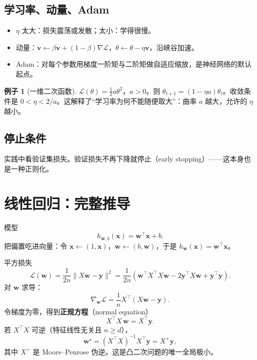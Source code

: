 \documentclass[11pt,a4paper]{article}
\theoremstyle{definition}
\newtheorem{example}{例子}[section]
\theoremstyle{plain}
\theoremstyle{remark}
\newcommand{\loss}{\mathcal{L}}
\begin{document}
\subsection{学习率、动量、Adam}

\begin{itemize}[leftmargin=1.4em]
  \item $\eta$ 太大：损失震荡或发散；太小：学得很慢。
  \item 动量：$\mathbf{v}\leftarrow\beta\mathbf{v}+(1-\beta)\nabla\loss$，$\theta\leftarrow\theta-\eta\mathbf{v}$，沿峡谷加速。
  \item Adam：对每个参数用梯度一阶矩与二阶矩做自适应缩放，是神经网络的默认起点。
\end{itemize}

\begin{example}[一维二次函数]
$\loss(\theta)=\frac12 a\theta^2$，$a>0$。则 $\theta_{t+1}=(1-\eta a)\theta_t$。收敛条件是 $0<\eta<2/a$。这解释了``学习率为何不能随便取大''：曲率 $a$ 越大，允许的 $\eta$ 越小。
\end{example}

\subsection{停止条件}

实践中看验证集损失。验证损失不再下降就停止（early stopping）——这本身也是一种正则化。

\section{线性回归：完整推导}
\label{sec:linreg}

模型
\begin{equation}
  h_{\mathbf{w},b}(\mathbf{x})=\mathbf{w}^\top\mathbf{x}+b.
\end{equation}
把偏置吃进向量：令 $\mathbf{x}\leftarrow(1,\mathbf{x})$，$\mathbf{w}\leftarrow(b,\mathbf{w})$，于是 $h_{\mathbf{w}}(\mathbf{x})=\mathbf{w}^\top\mathbf{x}$。

平方损失
\begin{equation}
  \loss(\mathbf{w})=\frac{1}{2n}\|X\mathbf{w}-\mathbf{y}\|^2
  =\frac{1}{2n}(\mathbf{w}^\top X^\top X\mathbf{w}-2\mathbf{y}^\top X\mathbf{w}+\mathbf{y}^\top\mathbf{y}).
\end{equation}
对 $\mathbf{w}$ 求导：
\begin{equation}
  \nabla_{\mathbf{w}}\loss=\frac{1}{n}X^\top(X\mathbf{w}-\mathbf{y}).
\end{equation}
令梯度为零，得到\textbf{正规方程}（normal equation）
\begin{equation}
\label{eq:normal}
  X^\top X\,\mathbf{w}=X^\top\mathbf{y}.
\end{equation}
若 $X^\top X$ 可逆（特征线性无关且 $n\ge d$），
\begin{equation}
  \mathbf{w}^\star=(X^\top X)^{-1}X^\top\mathbf{y}=X^{+}\mathbf{y},
\end{equation}
其中 $X^{+}$ 是 Moore--Penrose 伪逆。这是凸二次问题的唯一全局极小。
\end{document}
